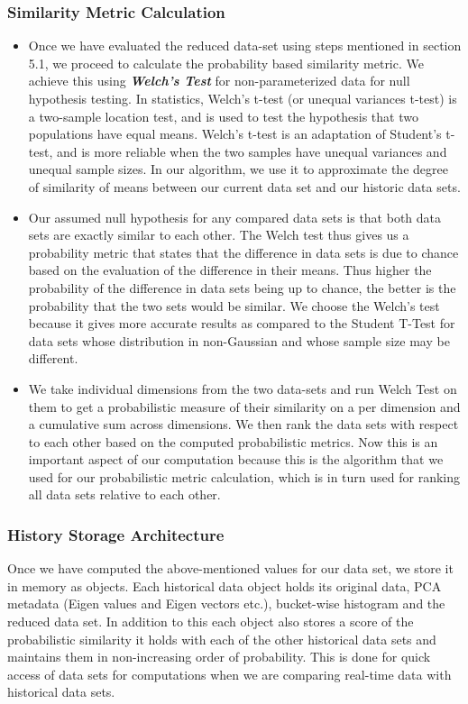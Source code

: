 \documentclass{vldb}
\begin{document}
\subsubsection{Similarity Metric Calculation}
\label{sim_calc}
\begin{itemize}
    \item Once we have evaluated the reduced data-set using steps mentioned in section 5.1, we proceed to calculate the probability based similarity metric. We achieve this using \textbf{\textit{Welch’s Test}}\cite{welch_test} for non-parameterized data for null hypothesis testing. In statistics, Welch's t-test (or unequal variances t-test) is a two-sample location test, and is used to test the hypothesis that two populations have equal means. Welch's t-test is an adaptation of Student's t-test, and is more reliable when the two samples have unequal variances and unequal sample sizes. In our algorithm, we use it to approximate the degree of similarity of means between our current data set and our historic data sets. 
    \item Our assumed null hypothesis for any compared data sets is that both data sets are exactly similar to each other. The Welch test thus gives us a probability metric that states that the difference in data sets is due to chance based on the evaluation of the difference in their means. Thus higher the probability of the difference in data sets being up to chance, the better is the probability that the two sets would be similar. We choose the Welch's test because it gives more accurate results as compared to the Student T-Test for data sets whose distribution in non-Gaussian and whose sample size may be different.
    \item We take individual dimensions from the two data-sets and run Welch Test on them to get a probabilistic measure of their similarity on a per dimension and a cumulative sum across dimensions. We then rank the data sets with respect to each other based on the computed probabilistic metrics. Now this is an important aspect of our computation because this is the algorithm that we used for our probabilistic metric calculation, which is in turn used for ranking all data sets relative to each other.
\end{itemize}
\subsubsection{History Storage Architecture}
Once we have computed the above-mentioned values for our data set, we store it in memory as objects. Each historical data object holds its original data, PCA metadata (Eigen values and Eigen vectors etc.), bucket-wise histogram and the reduced data set. In addition to this each object also stores a score of the probabilistic similarity it holds with each of the other historical data sets and maintains them in non-increasing order of probability. This is done for quick access of data sets for computations when we are comparing real-time data with historical data sets.
\end{document}
